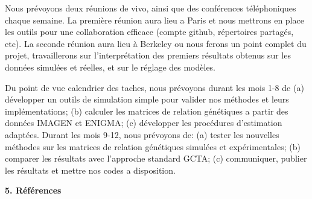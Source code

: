 \documentclass[11pt]{article}
\begin{document}
\noindent
Nous prévoyons deux réunions de vivo, ainsi que des conférences téléphoniques chaque semaine. La première réunion aura lieu a Paris et nous mettrons en place les outils pour une collaboration efficace (compte github, répertoires partagés, etc). La seconde réunion aura lieu à Berkeley ou nous ferons un point complet du projet, travaillerons sur l'interprétation des premiers résultats obtenus sur les données simulées et réelles, et sur le réglage des modèles.

Du point de vue calendrier des taches, nous prévoyons durant les mois 1-8 de (a) développer un outils de simulation simple pour valider nos méthodes et leurs implémentations; (b) calculer les matrices de relation génétiques a partir des données IMAGEN et ENIGMA; (c) développer les procédures d'estimation adaptées. Durant les mois 9-12, nous prévoyons de: (a) tester les nouvelles méthodes sur les matrices de relation génétiques simulées et expérimentales; (b) comparer les résultats avec l'approche standard GCTA; (c) communiquer, publier les résultats et mettre nos codes a disposition. 
\bigskip



\noindent
{\large \textbf{5. Références}}
\medskip
\end{document}
